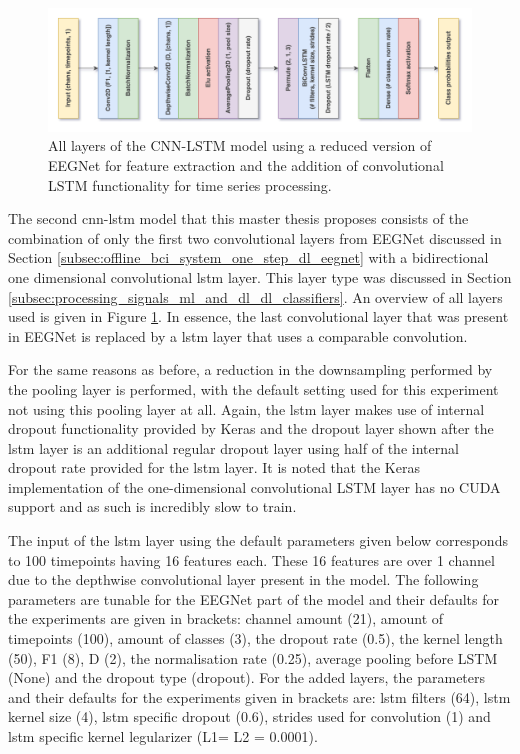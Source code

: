 \begin{figure}[t]
    \centering
    \includegraphics[width=\linewidth]{../images/pipeline/eegnetlstmconv_full.pdf}
    \captionsetup{width=0.8\linewidth}
    \captionsetup{justification=centering}
    \caption{All layers of the CNN-LSTM model using a reduced version of EEGNet for feature extraction and the addition of convolutional LSTM functionality for time series processing.}
    \label{fig:eegnetlstmconv_full}
\end{figure}

The second \gls{cnn}-\gls{lstm} model that this master thesis proposes consists of the combination of only the first two convolutional layers from EEGNet discussed in Section \ref{subsec:offline_bci_system_one_step_dl_eegnet} with a bidirectional one dimensional convolutional \gls{lstm} layer.
This layer type was discussed in Section \ref{subsec:processing_signals_ml_and_dl_dl_classifiers}.
An overview of all layers used is given in Figure \ref{fig:eegnetlstmconv_full}.
In essence, the last convolutional layer that was present in EEGNet is replaced by a \gls{lstm} layer that uses a comparable convolution.

For the same reasons as before, a reduction in the downsampling performed by the pooling layer is performed, with the default setting used for this experiment not using this pooling layer at all.
Again, the \gls{lstm} layer makes use of internal dropout functionality provided by Keras \citep{keras} and the dropout layer shown after the \gls{lstm} layer is an additional regular dropout layer using half of the internal dropout rate provided for the \gls{lstm} layer.
It is noted that the Keras implementation of the one-dimensional convolutional LSTM layer has no CUDA support and as such is incredibly slow to train.

The input of the \gls{lstm} layer using the default parameters given below corresponds to 100 timepoints having 16 features each.
These 16 features are over 1 channel due to the depthwise convolutional layer present in the model.
The following parameters are tunable for the EEGNet part of the model and their defaults for the experiments are given in brackets: channel amount (21), amount of timepoints (100), amount of classes (3), the dropout rate (0.5), the kernel length (50), F1 (8), D (2), the normalisation rate (0.25), average pooling before LSTM (None) and the dropout type (dropout).
For the added layers, the parameters and their defaults for the experiments given in brackets are: \gls{lstm} filters (64), \gls{lstm} kernel size (4), \gls{lstm} specific dropout (0.6), strides used for convolution (1) and \gls{lstm} specific kernel legularizer (L1= L2 = 0.0001).

